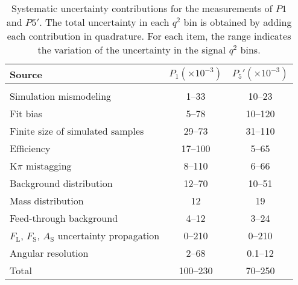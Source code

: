 \begin{table*}[htbp]
  \centering
  \caption{\label{tab:systematics} Systematic uncertainty contributions for the measurements of $P1$ and $P5'$.
    The total uncertainty in each $q^2$ bin is obtained by adding each contribution in quadrature.
    For each item, the range indicates the variation of the uncertainty in the signal $q^2$ bins.}
  \begin{tabular}{lcc}
    Source & $P_1 (\times 10^{-3})$ & $P_5' (\times 10^{-3})$ \\[1pt]
    \hline \\[-2ex]
    Simulation mismodeling       &   1--33   &  10--23  \\[1pt]
    Fit bias                     &   5--78   &  10--120 \\[1pt]
    Finite size of simulated samples  &  29--73   &  31--110 \\[1pt]
    Efficiency                   &  17--100  &   5--65  \\[1pt]
    $\textrm{K}\pi$ mistagging   &   8--110  &   6--66  \\[1pt]
    Background distribution      &  12--70   &  10--51  \\[1pt]
    Mass distribution            &      12   &      19  \\[1pt]
    Feed-through background      &   4--12   &   3--24  \\[1pt]
    $F_\mathrm{L}$, $F_\mathrm{S}$, $A_\mathrm{S}$ uncertainty propagation & 0--210 & 0--210 \\[1pt]
    Angular resolution           &   2--68   & 0.1--12  \\[1pt]
    \hline
    Total                        & 100--230  &  70--250 \\[1pt]
  \end{tabular}
\end{table*}
